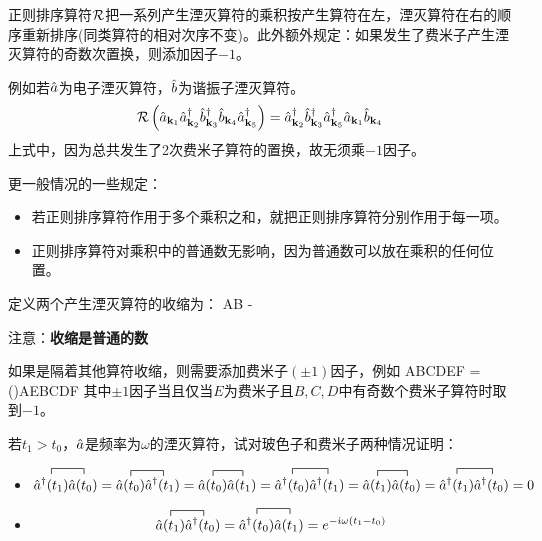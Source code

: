 \documentclass[CJK]{beamer}
\begin{document}
\begin{frame}
\bch
正则排序算符${\mathcal{R}}$把一系列产生湮灭算符的乘积按产生算符在左，湮灭算符在右的顺序重新排序(同类算符的相对次序不变)。此外额外规定：如果发生了费米子产生湮灭算符的奇数次置换，则添加因子$-1$。


例如若${\hat{a}}$为电子湮灭算符，${\hat{b}}$为谐振子湮灭算符。
$$\mathcal{R}\left({\hat{a}}_{{\mathbf{k}}_1}{\hat{a}^\dagger}_{{\mathbf{k}}_2}{\hat{b}^\dagger}_{{\mathbf{k}}_3}{\hat{b}}_{{\mathbf{k}}_4}{\hat{a}^\dagger}_{{\mathbf{k}}_5}\right) = {\hat{a}^\dagger}_{{\mathbf{k}}_2}{\hat{b}^\dagger}_{{\mathbf{k}}_3}{\hat{a}^\dagger}_{{\mathbf{k}}_5}{\hat{a}}_{{\mathbf{k}}_1}{\hat{b}}_{{\mathbf{k}}_4}$$
上式中，因为总共发生了2次费米子算符的置换，故无须乘$-1$因子。

\skipline
{\scriptsize
更一般情况的一些规定：
\begin{itemize}
\item{若正则排序算符作用于多个乘积之和，就把正则排序算符分别作用于每一项。}
\item{正则排序算符对乘积中的普通数无影响，因为普通数可以放在乘积的任何位置。}
\end{itemize}
}
\ech
\end{frame}


\begin{frame}
\bch
定义两个产生湮灭算符的收缩为：
\be
{}AB \equiv {}-
\ee

注意：{\bf 收缩是普通的数}

如果是隔着其他算符收缩，则需要添加费米子$(\pm 1)$因子，例如
\be
{}ABCDEF = ()AEBCDF
\ee
其中$\pm 1$因子当且仅当$E$为费米子且$B,C,D$中有奇数个费米子算符时取到$-1$。

\ech
\end{frame}

\begin{frame}
\bch
若$t_1>t_0$，${\hat{a}}$是频率为$\omega$的湮灭算符，试对玻色子和费米子两种情况证明：
{\scriptsize
\begin{itemize}
\item{$$\contraction{}{\adag(t_1)}{}{\hata(t_0)}\adag(t_1)\hata(t_0) = \contraction{}{\hata(t_0)}{}{\adag(t_1)}\hata(t_0)\adag(t_1) = \contraction{}{\hata(t_0)}{}{\hata(t_1)}\hata(t_0)\hata(t_1)=\contraction{}{\adag(t_0)}{}{\adag(t_1)}\adag(t_0)\adag(t_1) = \contraction{}{\hata(t_1)}{}{\hata(t_0)}\hata(t_1)\hata(t_0)=\contraction{}{\adag(t_1)}{}{\adag(t_0)}\adag(t_1)\adag(t_0)= 0$$}
\item{$$\contraction{}{\hata(t_1)}{}{\adag(t_0)}\hata(t_1)\adag(t_0) = \contraction{}{\adag(t_0)}{}{\hata(t_1)}\adag(t_0)\hata(t_1)=  e^{-\ii\omega (t_1-t_0)}$$}
\end{itemize}
}
\ech
\end{frame}
\end{document}
